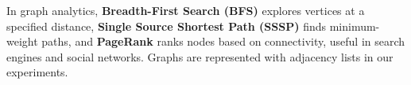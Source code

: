 In graph analytics, \textbf{Breadth-First Search (BFS)} explores vertices at a specified distance, \textbf{Single Source Shortest Path (SSSP)} finds minimum-weight paths, and \textbf{PageRank} ranks nodes based on connectivity, useful in search engines and social networks. Graphs are represented with adjacency lists in our experiments.
\begin{comment}
\textit{Nexus Machine} is designed to accelerate irregular workloads, such as sparse tensor algebra and graph analytics. We evaluated it on sparse, dense, and graph workloads to demonstrate its generality; benchmark details are provided in Table~\ref{table:datasets}.

\textbf{Dense Matrix Multiplication} multiplies two dense matrices, a critical workload for CNNs and LLMs, while \textbf{Dense Convolution} involves a dense kernel with dense activations, essential for CNNs. \textbf{Sparse Matrix-Vector Multiplication (SpMV)} multiplies a sparse matrix in CSR format with a dense vector, and \textbf{Sparse Matrix Multiplication (SpMSpM)} multiplies two sparse matrices using Gustavson’s row-wise algorithm, important for Pruned CNNs and Sparse Attention~\cite{sanger, vitcod}. \textbf{Sparse Matrix Addition (M+M)} sums two sparse matrices element-wise in CSR format, a key benchmark for accumulating CNN feature maps across output channels. \textbf{Sampled Dense-Dense Matrix Multiplication (SDDMM)} multiplies two dense matrices, evaluated only at non-zero entries of a sparse matrix, relevant to Sparse Attention and Graph Neural Networks. \textbf{Sparse Convolution} involves convolving sparse kernels with sparse activations, crucial for pruned CNN workloads~\cite{??}.

In graph analytics, \textbf{Breadth-First Search (BFS)} explores vertices at a specified distance, \textbf{Single Source Shortest Path (SSSP)} finds minimum-weight paths, and \textbf{PageRank} ranks nodes based on connectivity, useful in search engines and social networks. Graphs are represented with adjacency lists in our experiments.
\end{comment}
\vspace{-0.4cm}
